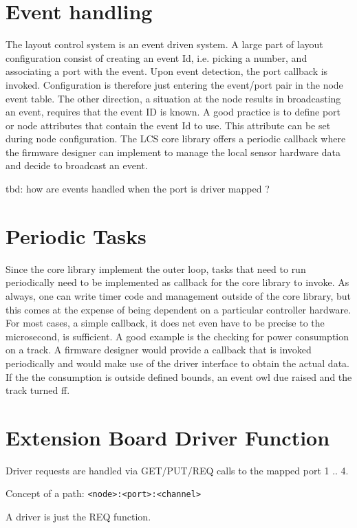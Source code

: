 \section{Event handling}

The layout control system is an event driven system. A large part of layout configuration consist of creating an event Id, i.e. picking a number, and associating a port with the event. Upon event detection, the port callback is invoked. Configuration is therefore just entering the event/port pair in the node event table. The other direction, a situation at the node results in broadcasting an event, requires that the event ID is known. A good practice is to define port or node attributes that contain the event Id to use. This attribute can be set during node configuration. The LCS core library offers a periodic callback where the firmware designer can implement to manage the local sensor hardware data and decide to broadcast an event.

tbd: how are events handled when the port is driver mapped ?

\section{Periodic Tasks}

Since the core library implement the outer loop, tasks that need to run periodically need to be implemented as callback for the core library to invoke. As always, one can write timer code and management outside of the core library, but this comes at the expense of being dependent on a particular controller hardware. For most cases, a simple callback, it does net even have to be precise to the microsecond, is sufficient. A good example is the checking for power consumption on a track. A firmware designer would provide a callback that is invoked periodically and would make use of the driver interface to obtain the actual data. If the the consumption is outside defined bounds, an event owl  due raised and the track turned ff. 

\section{Extension Board Driver Function}

Driver requests are handled via GET/PUT/REQ calls to the mapped port 1 .. 4.

Concept of a path: \texttt{<node>:<port>:<channel>}

A driver is just the REQ function. 


